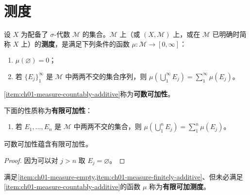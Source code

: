 \documentclass[../../main.tex]{subfiles}%
\begin{document}
\section{测度}\label{section:ch01-measures}


\begin{definition}[测度与可数可加性]\label{definition:ch01-measure-definition}
设 $X$ 为配备了 $\sigma$-代数 $\mathscr{M}$ 的集合。$\mathscr{M}$ 上（或 $(X,\mathscr{M})$ 上，或在 $\mathscr{M}$ 已明确时简称 $X$ 上）的\textbf{测度}，是满足下列条件的函数 $\mu:\mathscr{M}\to[0,\infty]$：
\begin{enumerate}[label=\roman*.,ref=(\roman*)]
\item\label{item:ch01-measure-empty} $\mu(\varnothing)=0$；
\item\label{item:ch01-measure-countably-additive} 若 $\{E_j\}_1^\infty$ 是 $\mathscr{M}$ 中两两不交的集合序列，则 $\mu(\bigcup_1^\infty E_j)=\sum_1^\infty\mu(E_j)$。
\end{enumerate}
\cref{item:ch01-measure-countably-additive}称为\textbf{可数可加性}。
\end{definition}

\begin{definition}[有限可加性]\label{definition:ch01-finite-additivity}
下面的性质称为\textbf{有限可加性}：
\begin{enumerate}[label=\roman*$'$.,ref=(\roman*$'$),start=2]
\item\label{item:ch01-measure-finitely-additive} 若 $E_1,\ldots,E_n$ 是 $\mathscr{M}$ 中两两不交的集合，则 $\mu(\bigcup_1^nE_j)=\sum_1^n\mu(E_j)$。
\end{enumerate}
\end{definition}
\begin{proposition}\label{proposition:ch01-countable-implies-finite-additivity}
可数可加性蕴含有限可加性。
\end{proposition}
\begin{proof}
因为可以对 $j>n$ 取 $E_j=\varnothing$。
\end{proof}
\begin{definition}[有限可加测度]\label{definition:ch01-finitely-additive-definition}
满足\cref{item:ch01-measure-empty,item:ch01-measure-finitely-additive}、但未必满足\cref{item:ch01-measure-countably-additive}的函数 $\mu$ 称为\textbf{有限可加测度}。
\end{definition}
\end{document}
